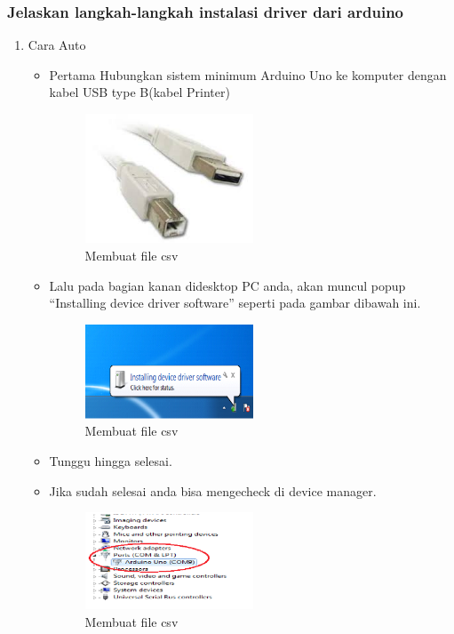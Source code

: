 \subsubsection{Jelaskan langkah-langkah instalasi driver dari arduino}
\begin{enumerate}
\item Cara Auto
\begin{itemize}
\item Pertama Hubungkan sistem minimum Arduino Uno ke komputer dengan kabel USB type B(kabel Printer)
\begin{figure}[H] 
\includegraphics[width=5cm]{figures/5/Teori/1174005/1.jpg}
\centering
\caption{Membuat file csv}
\end{figure}

\item Lalu pada bagian kanan didesktop PC anda, akan muncul popup “Installing device driver software” seperti pada gambar dibawah ini.
\begin{figure}[H] 
\includegraphics[width=5cm]{figures/5/Teori/1174005/2.png}
\centering
\caption{Membuat file csv}
\end{figure}

\item Tunggu hingga selesai.
\item Jika sudah selesai anda bisa mengecheck di device manager.
\begin{figure}[H] 
\includegraphics[width=5cm]{figures/5/Teori/1174005/11.png}
\centering
\caption{Membuat file csv}
\end{figure}
\end{itemize}


\end{enumerate}
